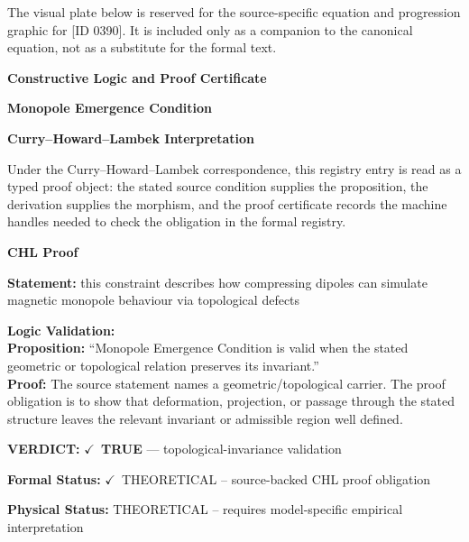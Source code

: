 \begingroup\footnotesize\sloppy
The visual plate below is reserved for the source-specific equation and progression graphic for [ID 0390]. It is included only as a companion to the canonical equation, not as a substitute for the formal text.
\par\endgroup
\ifTZPDarkEdition
{}
\fi

\clearpage
\begingroup\tzpsupportsetup
\noindent\textbf{\fontsize{10.8pt}{12.8pt}\selectfont [ID 0390] Constructive Logic and Proof Certificate}\par
\noindent\textbf{\fontsize{10pt}{12pt}\selectfont Monopole Emergence Condition}\par
\vspace{0.45em}
\begingroup
\footnotesize
\setlength{\parskip}{0.22em}
\setlength{\parindent}{0pt}
\noindent\textbf{Curry--Howard--Lambek Interpretation}\par
Under the Curry--Howard--Lambek correspondence, this registry entry is read as a typed proof
object: the stated source condition supplies the proposition, the derivation supplies the
morphism, and the proof certificate records the machine handles needed to check the obligation
in the formal registry.

\vspace{0.45em}
\noindent\textbf{CHL Proof}\par
\textbf{Statement:} this constraint describes how compressing dipoles can simulate magnetic monopole
behaviour via topological defects

\textbf{Logic Validation:}\\
\textbf{Proposition:} ``Monopole Emergence Condition is valid when the stated geometric or topological relation
preserves its invariant.''\\
\textbf{Proof:} The source statement names a geometric/topological carrier. The proof obligation is to
show that deformation, projection, or passage through the stated structure leaves the
relevant invariant or admissible region well defined.

\textbf{VERDICT:} \ensuremath{\checkmark}\ \textbf{TRUE} --- topological-invariance validation

\textbf{Formal Status:} \ensuremath{\checkmark}\ THEORETICAL -- source-backed CHL proof obligation

\textbf{Physical Status:} THEORETICAL -- requires model-specific empirical interpretation
\par\vspace{0.45em}
\par
\ifTZPDarkEdition
{}
\fi
\endgroup
\endgroup
